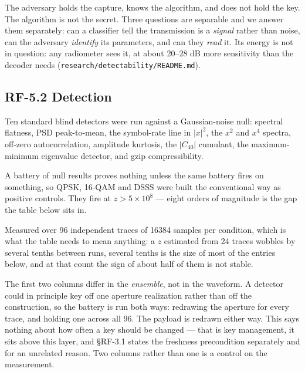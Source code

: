 \documentclass[10pt,letterpaper,twocolumn]{article}
\begin{document}
The adversary holds the capture, knows the algorithm, and does not hold the key. The algorithm is not the secret. Three questions are separable and we answer them separately: can a classifier tell the transmission is a \emph{signal} rather than noise, can the adversary \emph{identify} its parameters, and can they \emph{read} it. Its energy is not in question: any radiometer sees it, at about 20--28 dB more sensitivity than the decoder needs (\texttt{research/\allowbreak{}detectability/\allowbreak{}README.\allowbreak{}md}).

\subsection{RF-5.2 Detection}\label{rf-52-detection}

Ten standard blind detectors were run against a Gaussian-noise null: spectral flatness, PSD peak-to-mean, the symbol-rate line in \(|x|^2\), the \(x^2\) and \(x^4\) spectra, off-zero autocorrelation, amplitude kurtosis, the \(|C_{40}|\) cumulant, the maximum-minimum eigenvalue detector, and gzip compressibility.

A battery of null results proves nothing unless the same battery fires on something, so QPSK, 16-QAM and DSSS were built the conventional way as positive controls. They fire at \(z > 5\times10^{8}\) --- eight orders of magnitude is the gap the table below sits in.

Measured over 96 independent traces of 16384 samples per condition, which is what the table needs to mean anything: a \(z\) estimated from 24 traces wobbles by several tenths between runs, several tenths is the size of most of the entries below, and at that count the sign of about half of them is not stable.

The first two columns differ in the \emph{ensemble}, not in the waveform. A detector could in principle key off one aperture realization rather than off the construction, so the battery is run both ways: redrawing the aperture for every trace, and holding one across all 96. The payload is redrawn either way. This says nothing about how often a key should be changed --- that is key management, it sits above this layer, and §RF-3.1 states the freshness precondition separately and for an unrelated reason. Two columns rather than one is a control on the measurement.
\end{document}
